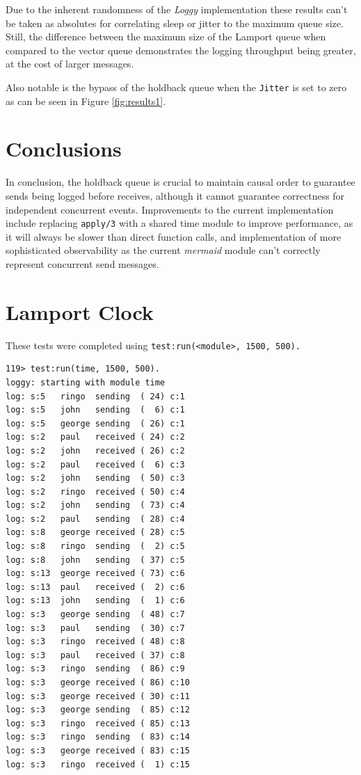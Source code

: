 \documentclass[a4paper, 11pt]{article}
\begin{document}
Due to the inherent randomness of the \textit{Loggy} implementation these results can't be taken as absolutes for correlating sleep or jitter to the maximum queue size.
Still, the difference between the maximum size of the Lamport queue when compared to the vector queue demonstrates the logging throughput being greater, at the cost of larger messages.

Also notable is the bypass of the holdback queue when the \texttt{Jitter} is set to zero as can be seen in Figure \ref{fig:results1}.

\section{Conclusions}

In conclusion, the holdback queue is crucial to maintain causal order to guarantee sends being logged before receives, although it cannot guarantee correctness for independent concurrent events. 
Improvements to the current implementation include replacing \texttt{apply/3} with a shared time module to improve performance, as it will always be slower than direct function calls, and implementation of more sophisticated observability as the current \textit{mermaid} module can't correctly represent concurrent send messages.

\newpage

\appendix

\section{Lamport Clock}
These tests were completed using \texttt{test:run(<module>, 1500, 500).}

\begin{verbatim}
119> test:run(time, 1500, 500).
loggy: starting with module time
log: s:5   ringo  sending  ( 24) c:1
log: s:5   john   sending  (  6) c:1
log: s:5   george sending  ( 26) c:1
log: s:2   paul   received ( 24) c:2
log: s:2   john   received ( 26) c:2
log: s:2   paul   received (  6) c:3
log: s:2   john   sending  ( 50) c:3
log: s:2   ringo  received ( 50) c:4
log: s:2   john   sending  ( 73) c:4
log: s:2   paul   sending  ( 28) c:4
log: s:8   george received ( 28) c:5
log: s:8   ringo  sending  (  2) c:5
log: s:8   john   sending  ( 37) c:5
log: s:13  george received ( 73) c:6
log: s:13  paul   received (  2) c:6
log: s:13  john   sending  (  1) c:6
log: s:3   george sending  ( 48) c:7
log: s:3   paul   sending  ( 30) c:7
log: s:3   ringo  received ( 48) c:8
log: s:3   paul   received ( 37) c:8
log: s:3   ringo  sending  ( 86) c:9
log: s:3   george received ( 86) c:10
log: s:3   george received ( 30) c:11
log: s:3   george sending  ( 85) c:12
log: s:3   ringo  received ( 85) c:13
log: s:3   ringo  sending  ( 83) c:14
log: s:3   george received ( 83) c:15
log: s:3   ringo  received (  1) c:15
\end{verbatim}
\end{document}
